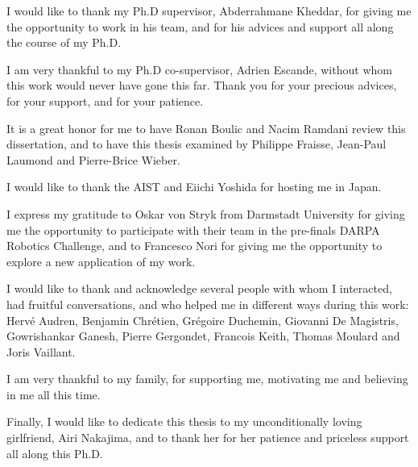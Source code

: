 
\begin{acknowledgements}

I would like to thank my Ph.D supervisor, Abderrahmane Kheddar, for giving me the opportunity to work in his team, and for his advices and support all along the course of my Ph.D.

I am very thankful to my Ph.D co-supervisor, Adrien Escande, without whom this work would never have gone this far.
Thank you for your precious advices, for your support, and for your patience.

It is a great honor for me to have Ronan Boulic and Nacim Ramdani review this dissertation, and to have this thesis examined by Philippe Fraisse, Jean-Paul Laumond and Pierre-Brice Wieber.

I would like to thank the AIST and Eiichi Yoshida for hosting me in Japan.

I express my gratitude to Oskar von Stryk from Darmstadt University for giving me the opportunity to participate with their team in the pre-finals DARPA Robotics Challenge, and to Francesco Nori for giving me the opportunity to explore a new application of my work.

I would like to thank and acknowledge several people with whom I interacted, had fruitful conversations, and who helped me in different ways during this work:
Herv\'e Audren,
Benjamin Chr\'etien,
Gr\'egoire Duchemin,
Giovanni De Magistris,
Gowrishankar Ganesh,
Pierre Gergondet,
Francois Keith,
Thomas Moulard and
Joris Vaillant.

I am very thankful to my family, for supporting me, motivating me and believing in me all this time.

Finally, I would like to dedicate this thesis to my unconditionally loving girlfriend, Airi Nakajima, and to thank her for her patience and priceless support all along this Ph.D.

\end{acknowledgements}
